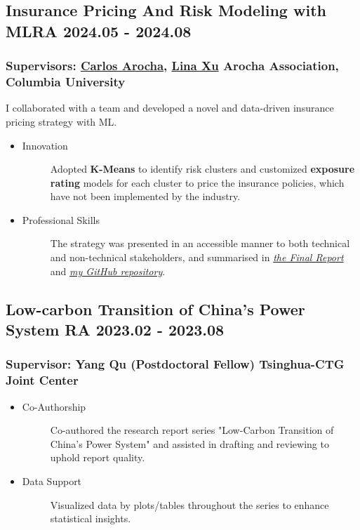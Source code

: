 \documentclass[a4paper]{article}
\newcommand{\IPReport}{\href{https://github.com/OrangeAoo/Insurance-Pricing-Project/blob/intproj/Pres-And-Reports/Final/Final-Report-Insurance-Pricing-2408.pdf}{\textit{the Final Report}}\xspace}
\newcommand{\GitHubIP}{\href{https://github.com/OrangeAoo/Insurance-Pricing-Project}{\textit{my GitHub repository}}\xspace}
\begin{document}
\hypertarget{integrated-project}{
    \subsection{Insurance Pricing And Risk Modeling with ML\normalfont \hfill RA \hspace{40pt} 2024.05 - 2024.08}}
\subsubsection{Supervisors: \href{https://www.linkedin.com/in/carocha/?originalSubdomain=ch}{Carlos Arocha}, \href{https://sps.columbia.edu/person/lina-xu}{Lina Xu} \hfill Arocha Association, Columbia University} 

I collaborated with a team and developed a novel and data-driven insurance pricing strategy with ML.

\begin{itemize}
    \item\begin{description}
        \item[Innovation] Adopted \textbf{K-Means} to identify risk clusters and customized \textbf{exposure rating} models for each cluster to price the insurance policies, which have not been implemented by the industry.
    \end{description}
    \item\begin{description}
        \item[Professional Skills]  The strategy was presented in an accessible manner to both technical and non-technical stakeholders, and summarised in \IPReport and \GitHubIP.
    \end{description}
\end{itemize} 

\subsection{Low-carbon Transition of China's Power System \normalfont \hfill RA \hspace{40pt} 2023.02 - 2023.08} 
\subsubsection{Supervisor:  Yang Qu (Postdoctoral Fellow) \hfill Tsinghua-CTG Joint Center} 

\begin{itemize}
    \item \begin{description}
        \item[Co-Authorship] Co-authored the research report series "Low-Carbon Transition of China’s Power System" and assisted in drafting and reviewing to uphold report quality.
    \end{description}
    \item \begin{description}
        \item[Data Support] Visualized data by plots/tables throughout the series to enhance statistical insights.
    \end{description} 
\end{itemize}
\end{document}
